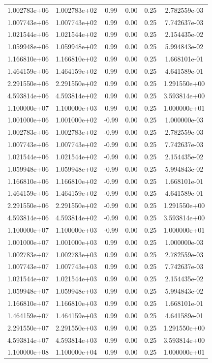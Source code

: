 \documentclass{article}
\begin{document}
\begin{table}[htbp]
\begin{tabular}{cccccc}
1.002783e+06 & 1.002783e+02 & 0.99 & 0.00 & 0.25 & 2.782559e-03 \\
1.007743e+06 & 1.007743e+02 & 0.99 & 0.00 & 0.25 & 7.742637e-03 \\
1.021544e+06 & 1.021544e+02 & 0.99 & 0.00 & 0.25 & 2.154435e-02 \\
1.059948e+06 & 1.059948e+02 & 0.99 & 0.00 & 0.25 & 5.994843e-02 \\
1.166810e+06 & 1.166810e+02 & 0.99 & 0.00 & 0.25 & 1.668101e-01 \\
1.464159e+06 & 1.464159e+02 & 0.99 & 0.00 & 0.25 & 4.641589e-01 \\
2.291550e+06 & 2.291550e+02 & 0.99 & 0.00 & 0.25 & 1.291550e+00 \\
4.593814e+06 & 4.593814e+02 & 0.99 & 0.00 & 0.25 & 3.593814e+00 \\
1.100000e+07 & 1.100000e+03 & 0.99 & 0.00 & 0.25 & 1.000000e+01 \\
1.001000e+06 & 1.001000e+02 & -0.99 & 0.00 & 0.25 & 1.000000e-03 \\
1.002783e+06 & 1.002783e+02 & -0.99 & 0.00 & 0.25 & 2.782559e-03 \\
1.007743e+06 & 1.007743e+02 & -0.99 & 0.00 & 0.25 & 7.742637e-03 \\
1.021544e+06 & 1.021544e+02 & -0.99 & 0.00 & 0.25 & 2.154435e-02 \\
1.059948e+06 & 1.059948e+02 & -0.99 & 0.00 & 0.25 & 5.994843e-02 \\
1.166810e+06 & 1.166810e+02 & -0.99 & 0.00 & 0.25 & 1.668101e-01 \\
1.464159e+06 & 1.464159e+02 & -0.99 & 0.00 & 0.25 & 4.641589e-01 \\
2.291550e+06 & 2.291550e+02 & -0.99 & 0.00 & 0.25 & 1.291550e+00 \\
4.593814e+06 & 4.593814e+02 & -0.99 & 0.00 & 0.25 & 3.593814e+00 \\
1.100000e+07 & 1.100000e+03 & -0.99 & 0.00 & 0.25 & 1.000000e+01 \\
1.001000e+07 & 1.001000e+03 & 0.99 & 0.00 & 0.25 & 1.000000e-03 \\
1.002783e+07 & 1.002783e+03 & 0.99 & 0.00 & 0.25 & 2.782559e-03 \\
1.007743e+07 & 1.007743e+03 & 0.99 & 0.00 & 0.25 & 7.742637e-03 \\
1.021544e+07 & 1.021544e+03 & 0.99 & 0.00 & 0.25 & 2.154435e-02 \\
1.059948e+07 & 1.059948e+03 & 0.99 & 0.00 & 0.25 & 5.994843e-02 \\
1.166810e+07 & 1.166810e+03 & 0.99 & 0.00 & 0.25 & 1.668101e-01 \\
1.464159e+07 & 1.464159e+03 & 0.99 & 0.00 & 0.25 & 4.641589e-01 \\
2.291550e+07 & 2.291550e+03 & 0.99 & 0.00 & 0.25 & 1.291550e+00 \\
4.593814e+07 & 4.593814e+03 & 0.99 & 0.00 & 0.25 & 3.593814e+00 \\
1.100000e+08 & 1.100000e+04 & 0.99 & 0.00 & 0.25 & 1.000000e+01 \\
\hline
\end{tabular}
\end{table}
\end{document}
